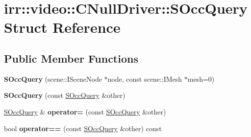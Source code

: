 \hypertarget{structirr_1_1video_1_1_c_null_driver_1_1_s_occ_query}{\section{irr\-:\-:video\-:\-:C\-Null\-Driver\-:\-:S\-Occ\-Query Struct Reference}
\label{structirr_1_1video_1_1_c_null_driver_1_1_s_occ_query}
}
\subsection*{Public Member Functions}
\begin{DoxyCompactItemize}
\item 
\hypertarget{structirr_1_1video_1_1_c_null_driver_1_1_s_occ_query_acf8a205ae6123a13e80311bee3d76262}{{\bfseries S\-Occ\-Query} (scene\-::\-I\-Scene\-Node $\ast$node, const scene\-::\-I\-Mesh $\ast$mesh=0)}\label{structirr_1_1video_1_1_c_null_driver_1_1_s_occ_query_acf8a205ae6123a13e80311bee3d76262}

\item 
\hypertarget{structirr_1_1video_1_1_c_null_driver_1_1_s_occ_query_a46aa7c9674e0813161f011dba96510ba}{{\bfseries S\-Occ\-Query} (const \hyperlink{structirr_1_1video_1_1_c_null_driver_1_1_s_occ_query}{S\-Occ\-Query} \&other)}\label{structirr_1_1video_1_1_c_null_driver_1_1_s_occ_query_a46aa7c9674e0813161f011dba96510ba}

\item 
\hypertarget{structirr_1_1video_1_1_c_null_driver_1_1_s_occ_query_a58f31c44eb0d02c556703c29fe42085c}{\hyperlink{structirr_1_1video_1_1_c_null_driver_1_1_s_occ_query}{S\-Occ\-Query} \& {\bfseries operator=} (const \hyperlink{structirr_1_1video_1_1_c_null_driver_1_1_s_occ_query}{S\-Occ\-Query} \&other)}\label{structirr_1_1video_1_1_c_null_driver_1_1_s_occ_query_a58f31c44eb0d02c556703c29fe42085c}

\item 
\hypertarget{structirr_1_1video_1_1_c_null_driver_1_1_s_occ_query_a375783b45a3ba80fcd785ac195c5478c}{bool {\bfseries operator==} (const \hyperlink{structirr_1_1video_1_1_c_null_driver_1_1_s_occ_query}{S\-Occ\-Query} \&other) const }\label{structirr_1_1video_1_1_c_null_driver_1_1_s_occ_query_a375783b45a3ba80fcd785ac195c5478c}

\end{DoxyCompactItemize}
